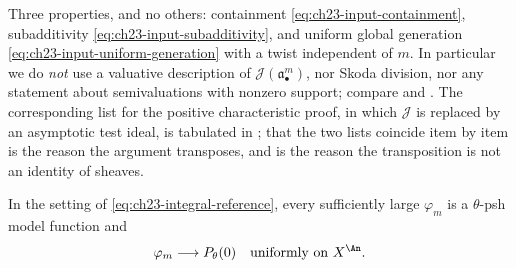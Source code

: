 \begin{remark}
\label{rem:ch23-what-is-imported}
Three properties, and no others: containment
\eqref{eq:ch23-input-containment}, subadditivity
\eqref{eq:ch23-input-subadditivity}, and uniform global generation
\eqref{eq:ch23-input-uniform-generation} with a twist independent of \(m\).
In particular we do \emph{not} use a valuative description of
\(\mathcal J(\mathfrak a_\bullet^m)\), nor Skoda division, nor any statement
about semivaluations with nonzero support; compare
 and
.  The corresponding list for the positive
characteristic proof, in which \(\mathcal J\) is replaced by an asymptotic
test ideal, is tabulated in ; that the two
lists coincide item by item is the reason the argument transposes, and
 is the reason the transposition is
not an identity of sheaves.
\end{remark}

\begin{theorem}\label{thm:ch23-base-ideal-approximation}
In the setting of \eqref{eq:ch23-integral-reference}, every sufficiently
large
\(\varphi_m\) is a \(\theta\)-psh model function and
\begin{equation}\label{eq:ch23-base-ideal-convergence}
                         \varphi_m\longrightarrow P_\theta(0)
                         \quad\text{uniformly on }X^{\An}.
\end{equation}
\end{theorem}

